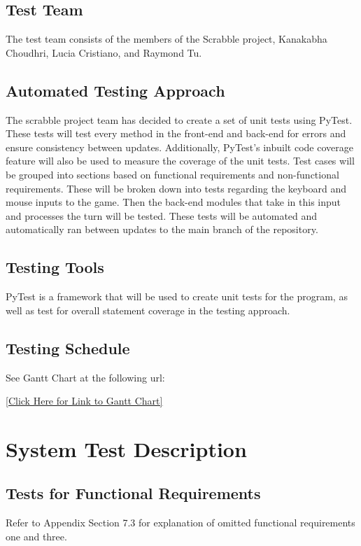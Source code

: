 \documentclass[12pt, titlepage]{article}
\begin{document}
\subsection{Test Team}
The test team consists of the members of the Scrabble project, Kanakabha Choudhri, Lucia Cristiano, and Raymond Tu.

\subsection{Automated Testing Approach}
The scrabble project team has decided to create a set of unit tests using PyTest. These tests will test every method in the front-end and back-end for errors and ensure consistency between updates. Additionally, PyTest's inbuilt code coverage feature will also be used to measure the coverage of the unit tests. Test cases will be grouped into sections based on functional requirements and non-functional requirements. These will be broken down into tests regarding the keyboard and mouse inputs to the game. Then the back-end modules that take in this input and processes the turn will be tested. These tests will be automated and automatically ran between updates to the main branch of the repository. 

\subsection{Testing Tools} %

PyTest is a framework that will be used to create unit tests for the program, as well as test for overall statement coverage in the testing approach.

\subsection{Testing Schedule} %
		
See Gantt Chart at the following url:

\href{https://gitlab.cas.mcmaster.ca/choudhrk/thetrifecta_scrabble/blob/master/ProjectSchedule/3XA3\%20Gantt\%20Chart.pdf}{[Click Here for Link to Gantt Chart]}

\section{System Test Description}
	
\subsection{Tests for Functional Requirements} 
Refer to Appendix Section 7.3 for explanation of omitted functional requirements one and three. 
\end{document}

